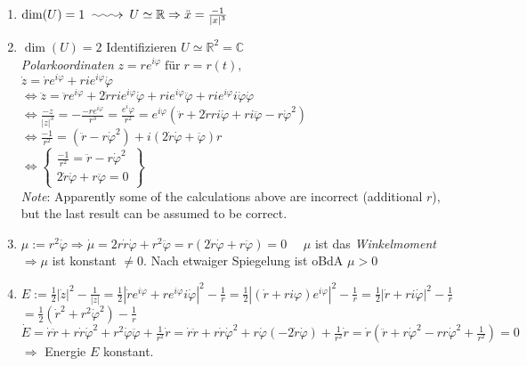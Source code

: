 \documentclass[12pt,a4paper,titlepage]{article}
\makeatletter
\newcommand{\longsquiggly}{\xymatrix{{}\ar@{~>}[r]&{}}}
\newcommand{\setC}{\mathbb{C}}
\newcommand{\setR}{\mathbb{R}}
\makeatother
\begin{document}
\begin{enumerate}[label=(\arabic*)]
\item $\dim(U)=1 \longsquiggly U\simeq \setR \Rightarrow \ddot x=\frac{-1}{|x|^3}$
  
\item $\dim(U)=2 $ Identifizieren $U\simeq \setR^2=\setC$ \\
  \textit{Polarkoordinaten} $z=re^{i\varphi}\;\text{für}\;r=r(t),$ \\
  $\dot z=\dot re^{i\varphi}+rie^{i\varphi}\dot\varphi$ \\
  $\iff \ddot z=\ddot re^{i\varphi}+2\dot rrie^{i\varphi}\dot\varphi+rie^{i\varphi}\ddot\varphi+rie^{i\varphi}i\dot\varphi\dot\varphi$ \\
  $\iff \frac{-z}{|z|^3}=-\frac{-re^{i\varphi}}{r^3}=\frac{e^i\varphi}{r^2}=e^{i\varphi}(\ddot r+2\dot rri\dot\varphi+ri\ddot\varphi-r\dot\varphi^2)$ \\
  $\iff \frac{-1}{r^2}=(\ddot r-r\dot\varphi^2)+i(2\dot r\dot\varphi+\ddot\varphi)r$ \\
  $\iff\left\{\begin{array}{l}
      \frac{-1}{r^2}=\ddot r-r\dot\varphi^2 \\
      2\dot r\dot\varphi+r\ddot\varphi=0
    \end{array}\right\}$ \\
  \textit{Note}: Apparently some of the calculations above are incorrect (additional $r$), but the last result can be assumed to be correct.

\item $\mu:=r^2\dot\varphi \Rightarrow \dot\mu=2r\dot r\dot\varphi+r^2\ddot\varphi=r(2\dot r\dot\varphi+r\ddot\varphi)=0$ $\quad\mu$ ist das \emph{Winkelmoment} \\
  $\Rightarrow \mu$ ist konstant $\neq 0$. Nach etwaiger Spiegelung ist oBdA $\mu>0$

\item $E:=\frac{1}{2}|\dot z|^2-\frac{1}{|z|} = \frac{1}{2}|\dot re^{i\varphi}+re^{i\varphi}i\dot\varphi|^2-\frac{1}{r} = \frac{1}{2}|(\dot r+ri\varphi)e^{i\varphi}|^2-\frac{1}{r} = \frac{1}{2}|\dot r+ri\dot\varphi|^2-\frac{1}{r} $ \\
  $= \frac{1}{2}(\dot r^2+r^2\dot\varphi^2)-\frac{1}{r} $ \\
  $\dot E=\dot r\ddot r+r\dot r\dot\varphi^2+r^2\dot\varphi\ddot\varphi+\frac{1}{r^2}\dot r = \dot r\ddot r+r\dot r\dot\varphi^2+r\dot\varphi(-2\dot r\dot\varphi)+\frac{1}{r^2}\dot r = \dot r(\ddot r+r\dot\varphi^2-rr\dot\varphi^2+\frac{1}{r^2})=0$ \\
  $\Rightarrow$ Energie $E$ konstant.


\end{enumerate}
\end{document}
